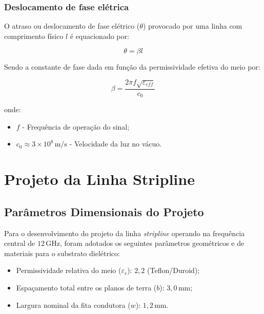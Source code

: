 \documentclass[12pt,a4paper]{report}
\begin{document}
\subsection{Deslocamento de fase elétrica}

O atraso ou deslocamento de fase elétrico ($\theta$) provocado por uma linha com comprimento físico $l$ é equacionado por:

\begin{equation}
\boxed{
\theta = \beta l
}
\end{equation}

Sendo a constante de fase dada em função da permissividade efetiva do meio por:

\begin{equation}
\boxed{
\beta = \frac{2\pi f \sqrt{\varepsilon_{eff}}}{c_0}
}
\end{equation}

onde:

\begin{itemize}
    \item $f$ - Frequência de operação do sinal; 
    \item $c_0 \approx 3 \times 10^8\,\text{m/s}$ - Velocidade da luz no vácuo.
\end{itemize}


\chapter{Projeto da Linha Stripline}

\section{Parâmetros Dimensionais do Projeto}

Para o desenvolvimento do projeto da linha \textit{stripline} operando na frequência central de $12\,\text{GHz}$, foram adotados os seguintes parâmetros geométricos e de materiais para o substrato dielétrico:

\begin{itemize}
    \item Permissividade relativa do meio ($\varepsilon_r$): $2,2$ (Teflon/Duroid);
    \item Espaçamento total entre os planos de terra ($b$): $3,0\,\text{mm}$;
    \item Largura nominal da fita condutora ($w$): $1,2\,\text{mm}$.
\end{itemize}
\end{document}
